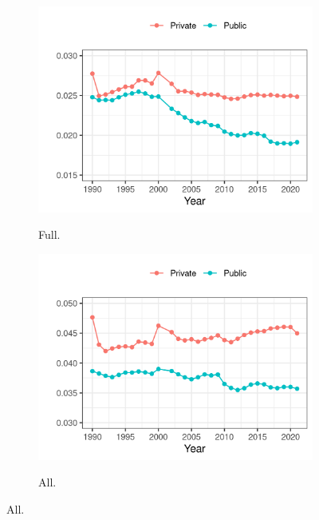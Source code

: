 \documentclass[notitlepage,12pt]{article}
\begin{document}
\begin{figure}[h!]
\begin{subfigure}[b]{0.495\textwidth}
        \label{fig:assistant-fte-perprof}
    \end{subfigure}
    \begin{subfigure}[b]{0.495\textwidth}
        \centering
        \caption{Full.}
        \includegraphics[width=\textwidth]{figures/full-fte-perprof.png}
        \label{fig:full-fte-perprof}
    \end{subfigure}
    \begin{subfigure}[b]{0.495\textwidth}
        \centering
        \caption{All.}
        \includegraphics[width=\textwidth]{figures/all-fte-perprof.png}
        \label{fig:all-fte-perprof}
    \end{subfigure}
    \label{fig:fte-perprof}
\end{figure}
\end{document}
